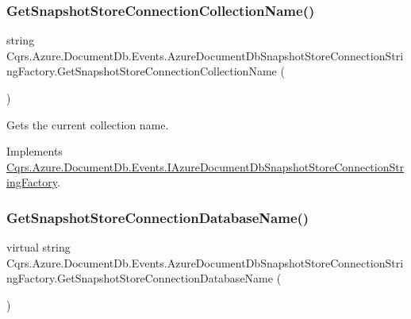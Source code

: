 \subsubsection{\texorpdfstring{Get\+Snapshot\+Store\+Connection\+Collection\+Name()}{GetSnapshotStoreConnectionCollectionName()}}
{\footnotesize\ttfamily string Cqrs.\+Azure.\+Document\+Db.\+Events.\+Azure\+Document\+Db\+Snapshot\+Store\+Connection\+String\+Factory.\+Get\+Snapshot\+Store\+Connection\+Collection\+Name (\begin{DoxyParamCaption}{ }\end{DoxyParamCaption})}



Gets the current collection name. 



Implements \hyperlink{interfaceCqrs_1_1Azure_1_1DocumentDb_1_1Events_1_1IAzureDocumentDbSnapshotStoreConnectionStringFactory_ad300bf0d143c3ad5d3bb1dfa22422645_ad300bf0d143c3ad5d3bb1dfa22422645}{Cqrs.\+Azure.\+Document\+Db.\+Events.\+I\+Azure\+Document\+Db\+Snapshot\+Store\+Connection\+String\+Factory}.

\mbox{\label{classCqrs_1_1Azure_1_1DocumentDb_1_1Events_1_1AzureDocumentDbSnapshotStoreConnectionStringFactory_a7e27bfdf697514310a63cc673aa8d800_a7e27bfdf697514310a63cc673aa8d800}} 
\subsubsection{\texorpdfstring{Get\+Snapshot\+Store\+Connection\+Database\+Name()}{GetSnapshotStoreConnectionDatabaseName()}}
{\footnotesize\ttfamily virtual string Cqrs.\+Azure.\+Document\+Db.\+Events.\+Azure\+Document\+Db\+Snapshot\+Store\+Connection\+String\+Factory.\+Get\+Snapshot\+Store\+Connection\+Database\+Name (\begin{DoxyParamCaption}{ }\end{DoxyParamCaption})\hspace{0.3cm}{\ttfamily [virtual]}}



